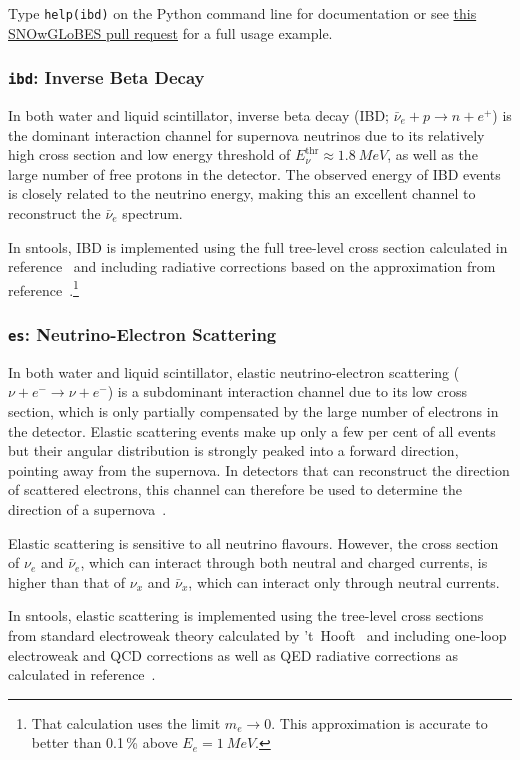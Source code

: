 \documentclass[11pt, oneside]{article}
\newcommand{\nue}{\ensuremath{\nu_e}\xspace}
\newcommand{\nux}{\ensuremath{\nu_x}\xspace}
\newcommand{\nuebar}{\ensuremath{\bar{\nu}_e}\xspace}
\newcommand{\nuxbar}{\ensuremath{\bar{\nu}_x}\xspace}
\begin{document}
Type \texttt{help(ibd)} on the Python command line for documentation or see \href{https://github.com/SNOwGLoBES/snowglobes/pull/12/commits/f1cf96d8c326b99ac35474bb6a36ef4d1fde809d}{this SNOwGLoBES pull request} for a full usage example.


\subsubsection{\texttt{ibd}: Inverse Beta Decay}
In both water and liquid scintillator, inverse beta decay (IBD; $\nuebar + p \rightarrow n + e^+$) is the dominant interaction channel for supernova neutrinos due to its relatively high cross section and low energy threshold of $E_\nu^\text{thr} \approx \SI{1.8}{MeV}$, as well as the large number of free protons in the detector.
The observed energy of IBD events is closely related to the neutrino energy, making this an excellent channel to reconstruct the \nuebar spectrum.

In sntools, IBD is implemented using the full tree-level cross section calculated in reference~\cite{Strumia2003} and including radiative corrections based on the approximation from reference~\cite{Kurylov2003}.\footnote{That calculation uses the limit $m_e \rightarrow 0$. This approximation is accurate to better than 0.1\,\% above $E_e = \SI{1}{MeV}$.}


\subsubsection{\texttt{es}: Neutrino-Electron Scattering}
In both water and liquid scintillator, elastic neutrino-electron scattering  ($\nu + e^- \rightarrow \nu + e^-$) is a subdominant interaction channel due to its low cross section, which is only partially compensated by the large number of electrons in the detector.
Elastic scattering events make up only a few per cent of all events but their angular distribution is strongly peaked into a forward direction, pointing away from the supernova.
In detectors that can reconstruct the direction of scattered electrons, this channel can therefore be used to determine the direction of a supernova~\cite{Abe2016,HKDR2018}.

Elastic scattering is sensitive to all neutrino flavours.
However, the cross section of \nue and \nuebar, which can interact through both neutral and charged currents, is higher than that of \nux and \nuxbar, which can interact only through neutral currents.

In sntools, elastic scattering is implemented using the tree-level cross sections from standard electroweak theory calculated by ’t~Hooft~\cite{t-Hooft1971} and including one-loop electroweak and QCD corrections as well as QED radiative corrections as calculated in reference~\cite{Bahcall1995}.
\end{document}

